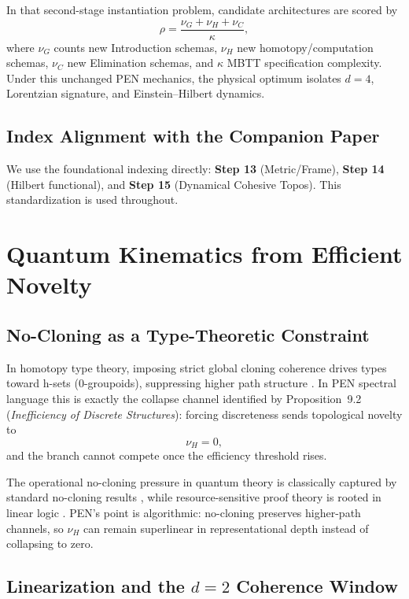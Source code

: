 \documentclass[12pt,a4paper]{article}
\theoremstyle{definition}
\begin{document}
In that second-stage instantiation problem, candidate architectures are scored by
\begin{equation}
\rho = \frac{\nu_G+\nu_H+\nu_C}{\kappa},
\end{equation}
where $\nu_G$ counts new Introduction schemas, $\nu_H$ new homotopy/computation schemas, $\nu_C$ new Elimination schemas, and $\kappa$ MBTT specification complexity. Under this unchanged PEN mechanics, the physical optimum isolates $d=4$, Lorentzian signature, and Einstein--Hilbert dynamics.

\subsection{Index Alignment with the Companion Paper}

We use the foundational indexing directly: \textbf{Step 13} (Metric/Frame), \textbf{Step 14} (Hilbert functional), and \textbf{Step 15} (Dynamical Cohesive Topos). This standardization is used throughout.

\section{Quantum Kinematics from Efficient Novelty}

\subsection{No-Cloning as a Type-Theoretic Constraint}

In homotopy type theory, imposing strict global cloning coherence drives types toward h-sets (0-groupoids), suppressing higher path structure \cite{hottbook}. In PEN spectral language this is exactly the collapse channel identified by Proposition~9.2 (\emph{Inefficiency of Discrete Structures}): forcing discreteness sends topological novelty to
\begin{equation}
\nu_H=0,
\end{equation}
and the branch cannot compete once the efficiency threshold rises.

The operational no-cloning pressure in quantum theory is classically captured by standard no-cloning results \cite{wootters-zurek,dieks}, while resource-sensitive proof theory is rooted in linear logic \cite{girard-linear-logic}. PEN's point is algorithmic: no-cloning preserves higher-path channels, so $\nu_H$ can remain superlinear in representational depth instead of collapsing to zero.

\subsection{Linearization and the $d=2$ Coherence Window}
\end{document}
